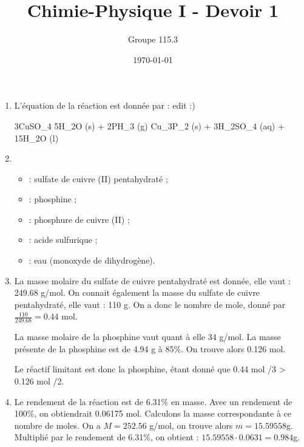 \documentclass{article}
\title{Chimie-Physique I - Devoir 1}
\author{Groupe 115.3}
\date{\today}
\begin{document}
\maketitle

\begin{enumerate}
	\item 
		L'\'equation de la r\'eaction est donn\'ee par : edit :)
		\begin{chemmath}
			3CuSO_4 \cdot 5H_2O (s) + 2PH_3 (g) \longrightarrow Cu_3P_2 (s) + 3H_2SO_4 (aq) + 15H_2O (l)
		\end{chemmath}
	\item 
		\begin{itemize}
			\item {} : sulfate de cuivre (II) pentahydrat\'e ;
			\item {} : phosphine ;
			\item {} : phosphure de cuivre (II) ;
			\item {} : acide sulfurique ;
			\item {} : eau (monoxyde de dihydrog\`ene).
		\end{itemize}
	\item
		La masse molaire du sulfate de cuivre pentahydrat\'e est donn\'ee, elle vaut : 249.68 g/mol. On connait 			\'egalement la masse du sulfate de cuivre pentahydrat\'e, elle vaut : 110 g. On a donc le nombre de mole, donn\'e par $\frac{110}{249.68} = 0.44$ mol.
		
		La masse molaire de la phosphine vaut quant \`a elle 34 g/mol. La masse pr\'esente de la phosphine est de 4.94 g \`a 85\%. On trouve alors 0.126 mol.
		
		Le r\'eactif limitant est donc la phosphine, \'etant donn\'e que 0.44 mol /3 > 0.126 mol /2. 
		
	\item
		Le rendement de la r\'eaction est de 6.31\% en masse. Avec un rendement de 100\%, on obtiendrait 0.06175 mol. Calculons la masse correspondante à ce nombre de moles. On a $M = 252.56$ g/mol, on trouve alors $m = 15.59558$g. Multipli\'e par le rendement de 6.31\%, on obtient : $15.59558 \cdot 0.0631 = 0.984$g.
\end{enumerate}
\end{document}
